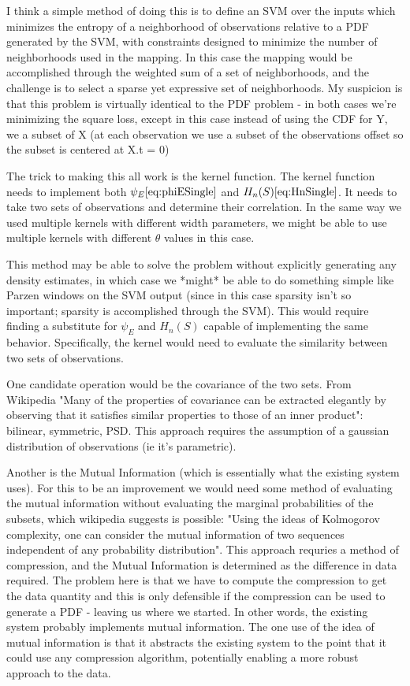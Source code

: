 \documentclass[10pt]{article}
\begin{document}
I think a simple method of doing this is to define an SVM over the inputs which minimizes the entropy of a neighborhood of observations relative to a PDF generated by the SVM, with constraints designed to minimize the number of neighborhoods used in the mapping.  In this case the mapping would be accomplished through the weighted sum of a set of neighborhoods, and the challenge is to select a sparse yet expressive set of neighborhoods.  My suspicion is that this problem is virtually identical to the PDF problem - in both cases we're minimizing the square loss, except in this case instead of using the CDF for Y, we a subset of X (at each observation we use a subset of the observations offset so the subset is centered at X.t = 0)

The trick to making this all work is the kernel function.  The kernel function needs to implement both \( \psi_E \ref{eq:phiESingle} \) and \( H_n(S) \ref{eq:HnSingle}\).  It needs to take two sets of observations and determine their correlation.  In the same way we used multiple kernels with different width parameters, we might be able to use multiple kernels with different \( \theta \) values in this case.  

This method may be able to solve the problem without explicitly generating any density estimates, in which case we *might* be able to do something simple like Parzen windows on the SVM output (since in this case sparsity isn't so important; sparsity is accomplished through the SVM).  This would require finding a substitute for \( \psi_E \) and \( H_n(S) \) capable of implementing the same behavior.  Specifically, the kernel would need to evaluate the similarity between two sets of observations.  

One candidate operation would be the covariance of the two sets.  From Wikipedia "Many of the properties of covariance can be extracted elegantly by observing that it satisfies similar properties to those of an inner product": bilinear, symmetric, PSD.  This approach requires the assumption of a gaussian distribution of observations (ie it's parametric).

Another is the Mutual Information (which is essentially what the existing system uses).  For this to be an improvement we would need some method of evaluating the mutual information without evaluating the marginal probabilities of the subsets, which wikipedia suggests is possible: "Using the ideas of Kolmogorov complexity, one can consider the mutual information of two sequences independent of any probability distribution".  This approach requries a method of compression, and the Mutual Information is determined as the difference in data required.  The problem here is that we have to compute the compression to get the data quantity and this is only defensible if the compression can be used to generate a PDF - leaving us where we started.  In other words, the existing system probably implements mutual information.  The one use of the idea of mutual information is that it abstracts the existing system to the point that it could use any compression algorithm, potentially enabling a more robust approach to the data.
\end{document}
